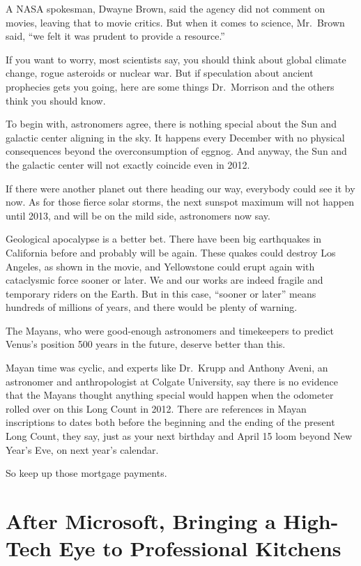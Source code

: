 ﻿\documentclass[12pt]{article}
\begin{document}
A NASA spokesman, Dwayne Brown, said the agency did not comment on movies, leaving that to movie
critics. But when it comes to science, Mr.~Brown said, ``we felt it was prudent to provide a
resource.''

If you want to worry, most scientists say, you should think about global climate change, rogue
asteroids or nuclear war. But if speculation about ancient prophecies gets you going, here are some
things Dr.~Morrison and the others think you should know.

To begin with, astronomers agree, there is nothing special about the Sun and galactic center
aligning in the sky. It happens every December with no physical consequences beyond the
overconsumption of eggnog. And anyway, the Sun and the galactic center will not exactly coincide
even in 2012.

If there were another planet out there heading our way, everybody could see it by now. As for those
fierce solar storms, the next sunspot maximum will not happen until 2013, and will be on the mild
side, astronomers now say.

Geological apocalypse is a better bet. There have been big earthquakes in California before and
probably will be again. These quakes could destroy Los Angeles, as shown in the movie, and
Yellowstone could erupt again with cataclysmic force sooner or later. We and our works are indeed
fragile and temporary riders on the Earth. But in this case, ``sooner or later'' means hundreds of
millions of years, and there would be plenty of warning.

The Mayans, who were good-enough astronomers and timekeepers to predict Venus's position 500 years
in the future, deserve better than this.

Mayan time was cyclic, and experts like Dr.~Krupp and Anthony Aveni, an astronomer and
anthropologist at Colgate University, say there is no evidence that the Mayans thought anything
special would happen when the odometer rolled over on this Long Count in 2012. There are references
in Mayan inscriptions to dates both before the beginning and the ending of the present Long Count,
they say, just as your next birthday and April 15 loom beyond New Year's Eve, on next year's
calendar.

So keep up those mortgage payments.

\section{After Microsoft, Bringing a High-Tech Eye to Professional Kitchens}
\end{document}
